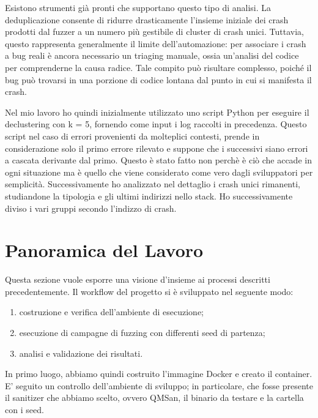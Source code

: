 Esistono strumenti già pronti che supportano questo tipo di analisi. La deduplicazione consente di ridurre drasticamente l’insieme iniziale dei crash prodotti dal fuzzer a un numero più gestibile di cluster di crash unici. Tuttavia, questo rappresenta generalmente il limite dell’automazione: per associare i crash a bug reali è ancora necessario un triaging manuale, ossia un’analisi del codice per comprenderne la causa radice. Tale compito può risultare complesso, poiché il bug può trovarsi in una porzione di codice lontana dal punto in cui si manifesta il crash.

Nel mio lavoro ho quindi inizialmente utilizzato uno script Python per eseguire il declustering con k = 5, fornendo come input i log raccolti in precedenza. Questo script nel caso di errori provenienti da molteplici contesti, prende in considerazione solo il primo errore rilevato e suppone che i successivi siano errori a cascata derivante dal primo. Questo è stato fatto non perchè è ciò che accade in ogni situazione ma è quello che viene considerato come vero dagli sviluppatori per semplicità.  Successivamente ho analizzato nel dettaglio i crash unici rimanenti, studiandone la tipologia e gli ultimi indirizzi nello stack. Ho successivamente diviso i vari gruppi secondo l’indizzo di crash. 

\section{Panoramica del Lavoro}

Questa sezione vuole esporre una visione d'insieme ai processi descritti precedentemente. 
Il workflow del progetto si è sviluppato nel seguente modo:

\begin{enumerate}
  \item costruzione e verifica dell'ambiente di esecuzione;
  \item esecuzione di campagne di fuzzing con differenti seed di partenza;
  \item analisi e validazione dei risultati. 
\end{enumerate}

In primo luogo, abbiamo quindi costruito l'immagine Docker e creato il container. E' seguito un controllo dell'ambiente di sviluppo; in particolare, che fosse presente il sanitizer che abbiamo scelto, ovvero QMSan, il binario da testare e la cartella con i seed. 

